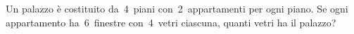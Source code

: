 \begin{multicols}{2}

\begin{esercizio}
\label{ese:1.48}
Un palazzo è costituito da~4~piani con~2~appartamenti per ogni piano. Se ogni appartamento ha~6~finestre con~4~vetri
ciascuna, quanti vetri ha il palazzo?
\end{esercizio}

% 

\end{multicols}


